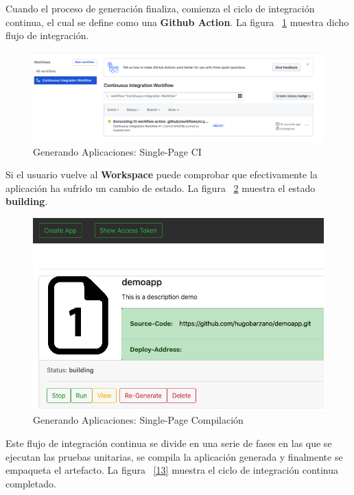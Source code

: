 \documentclass[a4paper,11pt]{book}
\begin{document}
Cuando el proceso de generación finaliza, comienza el ciclo de integración continua, el cual se define como una \textbf{Github Action}. La figura ~\ref{11} muestra dicho flujo de integración. 

\begin{figure}[H]
\centering
\includegraphics[scale=0.35]{imagenes/casouso_a/11.png}
\caption{  Generando Aplicaciones: Single-Page CI }
\label{11}
\end{figure}

Si el usuario vuelve al \textbf{Workspace} puede comprobar que efectivamente la aplicación ha sufrido un cambio de estado. La figura ~\ref{12} muestra el estado  \textbf{building}. 

\begin{figure}[H]
\centering
\includegraphics[scale=0.45]{imagenes/casouso_a/12.png}
\caption{ Generando Aplicaciones: Single-Page Compilación  }
\label{12}
\end{figure}


Este flujo de integración continua se divide en una serie de fases en las que se ejecutan las pruebas unitarias, se compila la aplicación generada y finalmente se empaqueta el artefacto. La figura ~\ref{13} muestra el ciclo de integración continua completado. 
\end{document}
